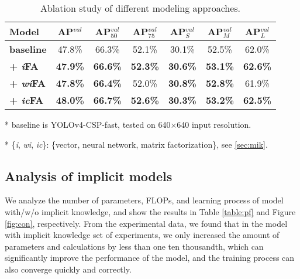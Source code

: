 \documentclass[10pt,twocolumn,letterpaper]{article}
\begin{document}
\begin{table}[h]
	\centering
	\vspace{-2mm}
	\begin{threeparttable}[h]
		\footnotesize
		\caption{Ablation study of different modeling approaches.}
		\label{table:e6}
		\setlength\tabcolsep{4.5pt}
		\begin{tabular}{lcccccc}
			\toprule
			\textbf{Model} & \textbf{AP$^{val}$} & \textbf{AP$^{val}_{50}$} & \textbf{AP$^{val}_{75}$} & \textbf{AP$^{val}_{S}$} & \textbf{AP$^{val}_{M}$} & \textbf{AP$^{val}_{L}$} \\				
			\midrule
			\textbf{baseline} & 47.8\% & 66.3\% & 52.1\% & 30.1\% & 52.5\% & 62.0\% \\				
			\midrule
			\textbf{+ \textit{i}FA} & \textbf{47.9\%} & \textbf{66.6\%} & \textbf{52.3\%} & \textbf{30.6\%} & \textbf{53.1\%} & \textbf{62.6\%} \\
			\textbf{+ \textit{wi}FA} & \textbf{47.8\%} & \textbf{66.4\%} & 52.0\% & \textbf{30.8\%} & \textbf{52.8\%} & 61.9\% \\
			\textbf{+ \textit{ic}FA} & \textbf{48.0\%} & \textbf{66.7\%} & \textbf{52.6\%} & \textbf{30.3\%} & \textbf{53.2\%} & \textbf{62.5\%} \\
			\bottomrule
		\end{tabular}
		\begin{tablenotes}[flushleft]
			\footnotesize
			\item[*] baseline is YOLOv4-CSP-fast, tested on 640$\times$640 input resolution.
			\item[*] \{\textit{i}, \textit{wi}, \textit{ic}\}: \{vector, neural network, matrix factorization\}, see \ref{sec:mik}.
		\end{tablenotes}
	\end{threeparttable}
    \vspace{-4mm}
\end{table}

\subsection{Analysis of implicit models}
\label{sec:an}

We analyze the number of parameters, FLOPs, and learning process of model with/w/o implicit knowledge, and show the results in Table \ref{table:pf} and Figure \ref{fig:con}, respectively. From the experimental data, we found that in the model with implicit knowledge set of experiments, we only increased the amount of parameters and calculations by less than one ten thousandth, which can significantly improve the performance of the model, and the training process can also converge quickly and correctly.
\end{document}

